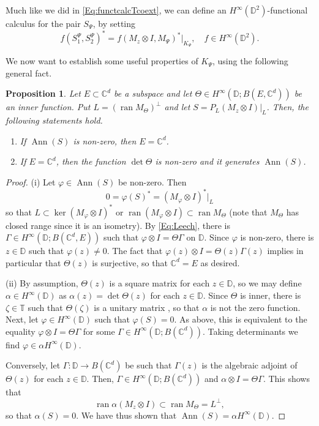 \documentclass[10pt]{amsart}
\newcommand{\bC}{{\mathbb{C}}}
\newcommand{\bD}{{\mathbb{D}}}
\newcommand{\bT}{{\mathbb{T}}}
\renewcommand{\phi}{\varphi}
\newcommand{\ran}{\operatorname{ran}}
\newcommand{\Ann}{\operatorname{Ann}}
\newtheorem{proposition}[lemma]{Proposition}
\theoremstyle{definition}
\begin{document}
Much like we did  in \eqref{Eq:functcalcTcoext}, we can define an $H^\infty(\bD^2)$-functional calculus for the pair $S_\Psi$, by setting
\begin{equation}\label{Eq:functcalcS}
f(S^\Psi_1,S^\Psi_2)^*=f(M_z\otimes I,M_\Psi)^*|_{K_\Psi}, \quad f\in H^\infty(\bD^2).
\end{equation}


We now want to establish some useful properties of $K_\Psi$, using the following general fact. 

\begin{proposition}\label{P:equaldefect}
Let $E\subset \bC^d$ be a subspace and let $\Theta\in H^\infty(\bD; B(E,\bC^d))$ be an inner function. Put $L=(\ran M_\Theta)^\perp$ and let $S=P_L (M_z\otimes I)|_L$. Then, the following statements hold.
\begin{enumerate}[{\rm (i)}]
\item If $\Ann(S)$ is non-zero, then $E=\bC^d$.
\item If $E=\bC^d$, then the function $\det \Theta$ is non-zero and it generates $\Ann(S)$.
\end{enumerate}
\end{proposition}
\begin{proof}
(i) Let $\phi\in \Ann(S)$ be non-zero. Then
\[
0=\phi(S)^*=(M_\phi\otimes I)^*|_L
\]
so that $L\subset \ker (M_\phi\otimes I)^*$ or $\ran (M_\phi\otimes I)\subset \ran M_\Theta$ (note that $M_\Theta$ has closed range since it is an isometry). By \eqref{Eq:Leech}, there is $\Gamma\in H^\infty(\bD; B(\bC^d,E))$ such that $ \phi\otimes I=\Theta\Gamma$ on $\bD$. Since $\phi$ is non-zero, there is $z\in \bD$ such that $\phi(z)\neq 0$. The fact that $\phi(z)\otimes I=\Theta(z)\Gamma(z)$ implies in particular that $\Theta(z)$ is surjective, so that $\bC^d=E$ as desired.

(ii) By assumption, $\Theta(z)$ is a square matrix for each $z\in \bD$, so we may define $\alpha\in H^\infty(\bD)$ as $\alpha(z)=\det \Theta(z)$ for each $z\in \bD$. Since $\Theta$ is inner, there is $\zeta\in \bT$ such that $\Theta(\zeta)$ is a unitary matrix \cite[Proposition V.2.2]{nagy2010}, so that $\alpha$ is not the zero function. Next, let $\phi\in H^\infty(\bD)$ such that $\phi(S)=0$. As above, this is equivalent to the equality $\phi\otimes I=\Theta\Gamma$ for some $\Gamma\in H^\infty(\bD; B(\bC^d))$. Taking determinants we find $\phi\in \alpha H^\infty(\bD)$. 

Conversely, let $\Gamma:\bD\to B(\bC^d)$ be such that $\Gamma(z)$ is the algebraic adjoint of $\Theta(z)$ for each $z\in \bD$. Then, $\Gamma\in H^\infty(\bD;B(\bC^d))$ and $\alpha \otimes I=\Theta\Gamma$. This shows that $$\ran \alpha (M_z \otimes I)\subset \ran M_\Theta=L^\perp,$$ so that $\alpha(S)=0$. We have thus shown that $\Ann(S)= \alpha H^\infty(\bD)$.
\end{proof}
\end{document}
